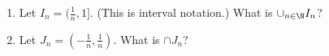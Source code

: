 \probsec{~\ref{sec:indexed-sets}}
\begin{enumerate}
    \item Let $I_n = (\frac{1}{n}, 1]$. (This is interval notation.) What is $\cup_{n \in \N} I_n$?

    \item Let $J_n = (-\frac{1}{n}, \frac{1}{n})$. What is $\cap J_n$?
\end{enumerate}
